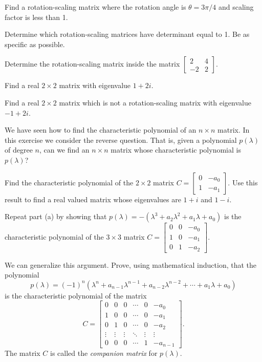 \item Find a rotation-scaling matrix where the rotation angle is $\theta=3\pi/4$ and scaling factor is less than 1.

\item Determine which rotation-scaling matrices have determinant equal to 1. Be as specific as possible.

\item Determine the rotation-scaling matrix inside the matrix $\left[ \begin{array}{rc} 2&4 \\ -2&2 \end{array} \right]$.

\item Find a real $2\times 2$ matrix with eigenvalue $1+2i$.

\item Find a real $2\times 2$ matrix which is not a rotation-scaling matrix with eigenvalue $-1+2i$.

\item We have seen how to find the characteristic polynomial of an $n \times n$ matrix. In this exercise we consider the reverse question. That is, given a polynomial $p(\lambda)$ of degree $n$, can we find an $n \times n$ matrix whose characteristic polynomial is $p(\lambda)$? 
\ba
\item Find the characteristic polynomial of the $2 \times 2$ matrix $C = \left[ \begin{array}{cc} 0&-a_0\\1&-a_1 \end{array} \right]$. Use this result to find a real valued matrix whose eigenvalues are $1+i$ and $1-i$. 

\item Repeat part (a) by showing that $p(\lambda) = -\left(\lambda^3+a_2\lambda^2+a_1\lambda+a_0\right)$ is the characteristic polynomial of the $3 \times 3$ matrix $C = \left[ \begin{array}{ccc} 0&0&-a_0\\1&0&-a_1\\0&1&-a_2 \end{array} \right]$.  

\item We can generalize this argument. Prove, using mathematical induction, that the polynomial
\[p(\lambda) =(-1)^n\left( \lambda^n + a_{n-1}\lambda^{n-1} + a_{n-2}\lambda^{n-2} + \cdots + a_1 \lambda + a_0\right)\]
is the characteristic polynomial of the matrix 
\[C = \left[ \begin{array}{cccccc} 0&0&0&\cdots&0&-a_{0}\\
1&0&0&\cdots&0&-a_{1} \\
0&1&0&\cdots&0&-a_2 \\
\vdots & \vdots &\vdots& \ddots & \vdots   & \vdots   \\
0 & 0 & 0& \cdots &  1 & -a_{n-1} 
\end{array} \right].\]
The matrix $C$ is called the \emph{companion matrix} for $p(\lambda)$.


